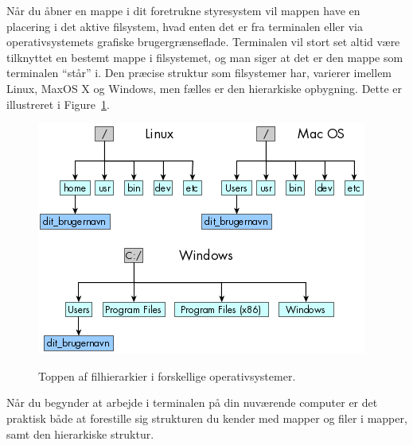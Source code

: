 \documentclass[a4paper]{article}
\begin{document}
Når du åbner en mappe i dit foretrukne styresystem vil mappen have en placering i det aktive filsystem, hvad enten det er fra terminalen eller via operativsystemets grafiske brugergrænseflade. Terminalen vil stort set altid være tilknyttet en bestemt mappe i filsystemet, og man siger at det er den mappe som terminalen "`står"' i. Den præcise struktur som filsystemer har, varierer imellem Linux, MaxOS X og Windows, men fælles er den hierarkiske opbygning. Dette er illustreret i Figure~\ref{fig:filhierakier}.
\begin{figure}
  \begin{center}
    {\includegraphics[width=\textwidth]{filehira.png}}
  \end{center}
  \caption{Toppen af filhierarkier i forskellige operativsystemer.}
  \label{fig:filhierakier}
\end{figure}
 Når du begynder at arbejde i terminalen på din nuværende computer er det praktisk både at forestille sig strukturen du kender med mapper og filer i mapper, samt den hierarkiske struktur.
\end{document}
